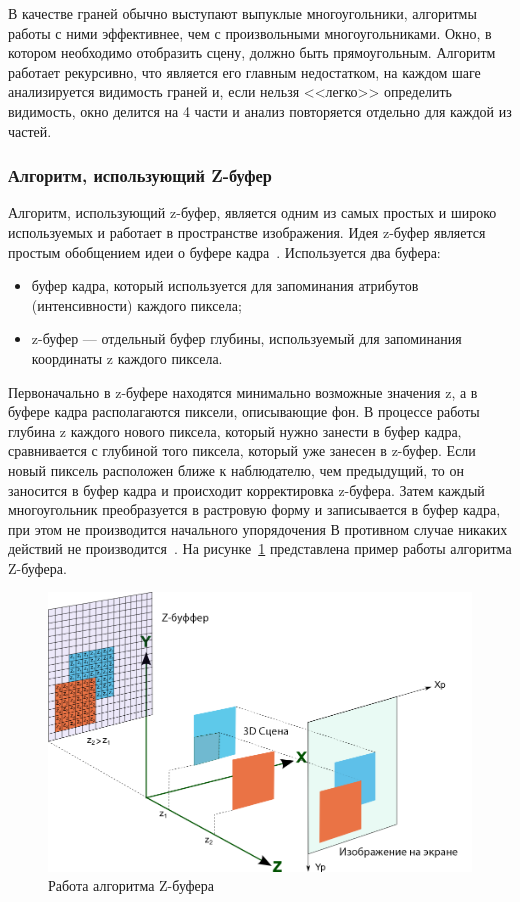 В качестве граней обычно выступают выпуклые многоугольники, алгоритмы работы с ними эффективнее, чем с произвольными многоугольниками.
Окно, в котором необходимо отобразить сцену, должно быть прямоугольным. 
Алгоритм работает рекурсивно, что является его главным недостатком, на каждом шаге анализируется видимость граней и, если нельзя <<легко>> определить видимость, окно делится на 4 части и анализ повторяется отдельно для каждой из частей. 

\subsubsection{Алгоритм, использующий Z-буфер}

Алгоритм, использующий z-буфер, является одним из самых простых и широко используемых и работает в пространстве изображения.
Идея z-буфер является простым обобщением идеи о буфере кадра~\cite{roders}.
Используется два буфера:
\begin{itemize}
	\item буфер кадра, который используется для запоминания атрибутов (интенсивности) каждого пиксела;
	\item z-буфер --- отдельный буфер глубины, используемый для запоминания координаты z каждого пиксела.
\end{itemize}

Первоначально в z-буфере находятся минимально возможные значения z, а в буфере кадра располагаются пиксели, описывающие фон.
В процессе работы глубина z каждого нового пиксела, который нужно занести в буфер кадра, сравнивается с глубиной того пиксела, который уже занесен в z-буфер.
Если новый пиксель расположен ближе к наблюдателю, чем предыдущий, то он заносится в буфер кадра и происходит корректировка z-буфера. Затем каждый многоугольник преобразуется в растровую форму и записывается в буфер кадра, при этом не производится начального упорядочения
В противном случае никаких действий не производится~\cite{roders}.
На рисунке~\ref{img:z-buffer} представлена пример работы алгоритма Z-буфера.
\begin{figure}[h]
	\centering
	\includegraphics[height=0.25\textheight]{img/z-buffer.png}
	\caption{Работа алгоритма Z-буфера}
	\label{img:z-buffer}
\end{figure}

